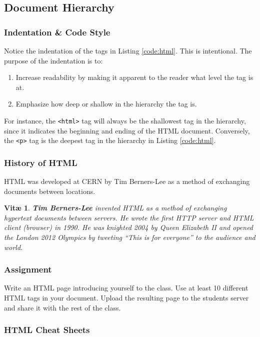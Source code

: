 \documentclass[aspectratio=169]{beamer}
\newtheorem{vita}{Vit\ae}
\begin{document}
\subsection{Document Hierarchy}
\begin{frame}
\frametitle{Indentation \& Code Style}
Notice the indentation of the tags in Listing \ref{code:html}. This is intentional. The purpose of the indentation is to:
\begin{enumerate}
	\item Increase readability by making it apparent to the reader what level the tag is at.
	\item Emphasize how deep or shallow in the hierarchy the tag is.
\end{enumerate}
For instance, the \texttt{<html>} tag will always be the shallowest tag in the hierarchy, since it indicates the beginning and ending of the HTML document. Conversely, the \texttt{<p>} tag is the deepest tag in the hierarchy in Listing \ref{code:html}.
\end{frame}

\begin{frame}
\frametitle{History of HTML}
HTML was developed at CERN by Tim Berners-Lee as a method of exchanging documents between locations.
\begin{vita}
\textbf{Tim Berners-Lee} invented HTML as a method of exchanging hypertext documents between servers. He wrote the first HTTP server and HTML client (browser) in 1990. He was knighted 2004 by Queen Elizabeth II and opened the London 2012 Olympics by tweeting ``This is for everyone'' to the audience and world.
\end{vita}
\end{frame}

\begin{frame}
\frametitle{Assignment}
Write an HTML page introducing yourself to the class. Use at least 10 different HTML tags in your document. Upload the resulting page to the students server and share it with the rest of the class.
\end{frame}

\begin{frame}
\frametitle{HTML Cheat Sheets}

\end{frame}
\end{document}
